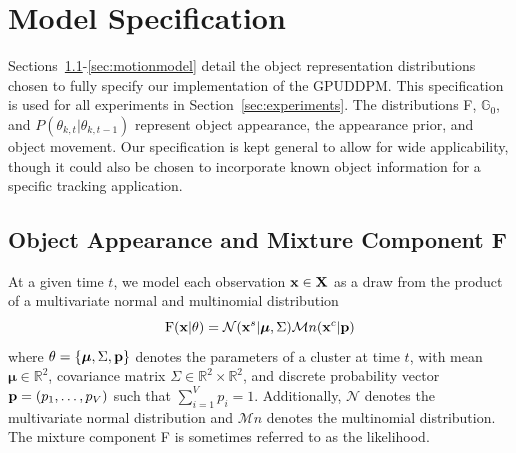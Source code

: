 \documentclass[twocolumn, final]{svjour3}
\begin{document}

\section{Model Specification}
\label{sec:modelspecification}

Sections~\ref{sec:objectappearance}-\ref{sec:motionmodel} detail the object representation distributions chosen to fully specify our implementation of the GPUDDPM. This specification is used for all experiments in Section~\ref{sec:experiments}. The distributions F, $\mathbb{G}_{0}$, and $P(\theta_{k, t} | \theta_{k, t-1})$ represent object appearance, the appearance prior, and object movement. Our specification is kept general to allow for wide applicability, though it could also be chosen to incorporate known object information for a specific tracking application.


\subsection{Object Appearance and Mixture Component F}
\label{sec:objectappearance}

At a given time $t$, we model each observation $\bold{x} \in \bold{X}$ as a draw from the product of a multivariate normal and multinomial distribution
\begin{equation}
\label{likelihood}
\text{F}(\bold{x}|\theta) = \mathcal{N}(\bold{x}^{s} | \boldsymbol{\mu}, \Sigma)  \mathcal{M}n(\bold{x}^{c} | \bold{p})
\end{equation}
where $\theta = \{ \boldsymbol{\mu}, \Sigma, \bold{p} \}$ denotes the parameters of a cluster at time $t$, with mean $\boldsymbol{\mu} \in \mathbb{R}^{2}$, covariance matrix $\Sigma \in \mathbb{R}^{2} \times \mathbb{R}^{2}$, and discrete probability vector $\bold{p} = (p_{1}, \ldots, p_{V})$ such that $\sum_{i=1}^{V}p_{i} = 1$. Additionally, $\mathcal{N}$ denotes the multivariate normal distribution and $\mathcal{M}n$ denotes the multinomial distribution. The mixture component F is sometimes referred to as the likelihood.
\end{document}
